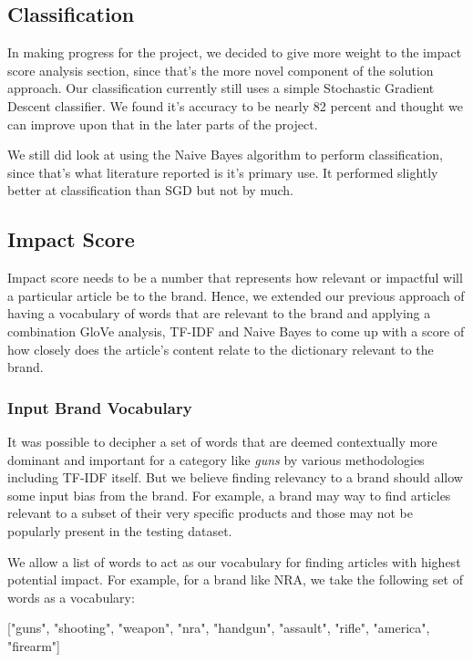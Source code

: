 \documentclass{article}
\begin{document}
\subsection {Classification}
In making progress for the project, we decided to give more weight to the impact score analysis section, since that's the more novel component of the solution approach. Our classification currently still uses a simple Stochastic Gradient Descent classifier. We found it's accuracy to be nearly 82 percent and thought we can improve upon that in the later parts of the project.

We still did look at using the Naive Bayes algorithm to perform classification, since that's what literature reported is it's primary use. It performed slightly better at classification than SGD but not by much.

\subsection {Impact Score}

Impact score needs to be a number that represents how relevant or impactful will a particular article be to the brand. Hence, we extended our previous approach of having a vocabulary of words that are relevant to the brand and applying a combination GloVe analysis, TF-IDF and Naive Bayes to come up with a score of how closely does the article's content relate to the dictionary relevant to the brand.

\subsubsection {Input Brand Vocabulary}
It was possible to decipher a set of words that are deemed contextually more dominant and important for a category like \textit{guns} by various methodologies including TF-IDF itself. But we believe finding relevancy to a brand should allow some input bias from the brand. For example, a brand may way to find articles relevant to a subset of their very specific products and those may not be popularly present in the testing dataset. 

We allow a list of words to act as our vocabulary for finding articles with highest potential impact. For example, for a brand like NRA, we take the following set of words as a vocabulary:
\begin{center}
["guns", "shooting", "weapon", "nra", "handgun", "assault", "rifle", "america", "firearm"]
\end {center}
\end{document}
